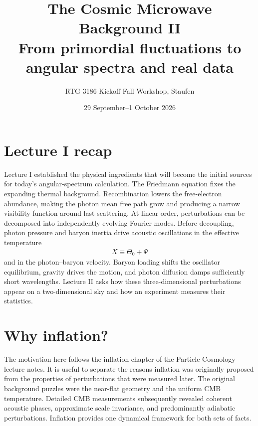 \documentclass[12pt]{article}
\title{The Cosmic Microwave Background II\\
From primordial fluctuations to angular spectra and real data}
\author{RTG 3186 Kickoff Fall Workshop, Staufen}
\date{29 September--1 October 2026}
\newcommand{\be}{\begin{eqnarray}}
\newcommand{\ee}{\end{eqnarray}}
\begin{document}
\maketitle

\begin{center}
\end{center}

\section{Lecture I recap}

Lecture I established the physical ingredients that will become the initial sources
for today's angular-spectrum calculation. The Friedmann equation fixes the expanding
thermal background. Recombination lowers the free-electron abundance, making the
photon mean free path grow and producing a narrow visibility function around last
scattering. At linear order, perturbations can be decomposed into independently
evolving Fourier modes. Before decoupling, photon pressure and baryon inertia drive
acoustic oscillations in the effective temperature
\be
X\equiv\Theta_0+\Psi
\ee
and in the photon--baryon velocity. Baryon loading shifts the oscillator equilibrium,
gravity drives the motion, and photon diffusion damps sufficiently short wavelengths.
Lecture II asks how these three-dimensional perturbations appear on a two-dimensional
sky and how an experiment measures their statistics.

\section{Why inflation?}

The motivation here follows the inflation chapter of the Particle Cosmology lecture
notes. It is useful to separate the reasons inflation was originally proposed from
the properties of perturbations that were measured later. The original background
puzzles were the near-flat geometry and the uniform CMB temperature. Detailed CMB
measurements subsequently revealed coherent acoustic phases, approximate scale
invariance, and predominantly adiabatic perturbations. Inflation provides one
dynamical framework for both sets of facts.
\end{document}
